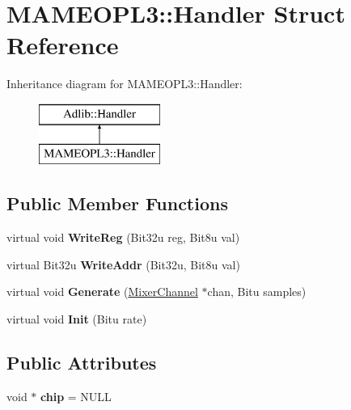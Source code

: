 \hypertarget{structMAMEOPL3_1_1Handler}{\section{M\-A\-M\-E\-O\-P\-L3\-:\-:Handler Struct Reference}
\label{structMAMEOPL3_1_1Handler}
}
Inheritance diagram for M\-A\-M\-E\-O\-P\-L3\-:\-:Handler\-:\begin{figure}[H]
\begin{center}
\leavevmode
\includegraphics[height=2.000000cm]{structMAMEOPL3_1_1Handler}
\end{center}
\end{figure}
\subsection*{Public Member Functions}
\begin{DoxyCompactItemize}
\item 
\hypertarget{structMAMEOPL3_1_1Handler_a903af88fdc2e8d43f6ac1f6da3645641}{virtual void {\bfseries Write\-Reg} (Bit32u reg, Bit8u val)}\label{structMAMEOPL3_1_1Handler_a903af88fdc2e8d43f6ac1f6da3645641}

\item 
\hypertarget{structMAMEOPL3_1_1Handler_a86658776086c980510f7d684ac71fc1d}{virtual Bit32u {\bfseries Write\-Addr} (Bit32u, Bit8u val)}\label{structMAMEOPL3_1_1Handler_a86658776086c980510f7d684ac71fc1d}

\item 
\hypertarget{structMAMEOPL3_1_1Handler_a6cee2abd16dd077eceb58117fad9bcd7}{virtual void {\bfseries Generate} (\hyperlink{classMixerChannel}{Mixer\-Channel} $\ast$chan, Bitu samples)}\label{structMAMEOPL3_1_1Handler_a6cee2abd16dd077eceb58117fad9bcd7}

\item 
\hypertarget{structMAMEOPL3_1_1Handler_a89c2dcd0b41d1da12ef7a98dc51d2f9f}{virtual void {\bfseries Init} (Bitu rate)}\label{structMAMEOPL3_1_1Handler_a89c2dcd0b41d1da12ef7a98dc51d2f9f}

\end{DoxyCompactItemize}
\subsection*{Public Attributes}
\begin{DoxyCompactItemize}
\item 
\hypertarget{structMAMEOPL3_1_1Handler_a77812ce708e65a61b562062ecfb52ce2}{void $\ast$ {\bfseries chip} = N\-U\-L\-L}\label{structMAMEOPL3_1_1Handler_a77812ce708e65a61b562062ecfb52ce2}

\end{DoxyCompactItemize}


